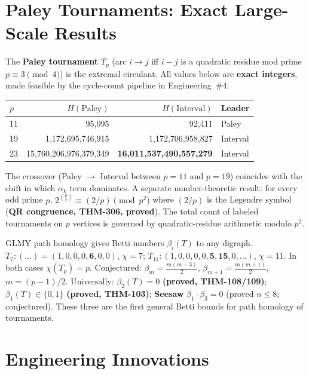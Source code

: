 \documentclass[10pt,letterpaper]{article}
\begin{document}
\section{Paley Tournaments: Exact Large-Scale Results}

The \textbf{Paley tournament} $T_p$ (arc $i\to j$ iff $i-j$ is a quadratic residue mod prime
$p\equiv 3\pmod 4$) is the extremal circulant. All values below are \textbf{exact integers},
made feasible by the cycle-count pipeline in Engineering~\#4:

\vspace{2pt}
\begin{center}
\small
\begin{tabular}{lrrl}
\toprule
$p$ & $H(\text{Paley})$ & $H(\text{Interval})$ & Leader \\
\midrule
11 & 95,095 & 92,411 & Paley \\
19 & 1,172,695,746,915 & 1,172,706,958,827 & Interval \\
23 & 15,760,206,976,379,349 & \textbf{16,011,537,490,557,279} & Interval \\
\bottomrule
\end{tabular}
\end{center}
\vspace{2pt}

The crossover (Paley $\to$ Interval between $p=11$ and $p=19$) coincides with the shift in
which $\alpha_k$ term dominates. A separate number-theoretic result: for every odd prime $p$,
$2^{\binom{p}{2}} \equiv (2/p) \pmod{p^2}$ where $(2/p)$ is the Legendre symbol
(\textbf{QR congruence, THM-306, proved}). The total count of labeled tournaments on $p$
vertices is governed by quadratic-residue arithmetic modulo $p^2$.

GLMY path homology gives Betti numbers $\beta_i(T)$ to any digraph.
$T_7\!: (\ldots) = (1,0,0,0,\mathbf{6},0,0)$, $\chi=7$;\;
$T_{11}\!: (1,0,0,0,0,\mathbf{5},\mathbf{15},0,\ldots)$, $\chi=11$. In both cases $\chi(T_p)=p$.
Conjectured: $\beta_m = \tfrac{m(m-3)}{2}$, $\beta_{m+1} = \tfrac{m(m+1)}{2}$, $m=(p-1)/2$.
Universally: $\beta_2(T)=0$ \textbf{(proved, THM-108/109)}; $\beta_1(T)\in\{0,1\}$
\textbf{(proved, THM-103)}; \textbf{Seesaw} $\beta_1\!\cdot\!\beta_3=0$ (proved $n\leq 8$;
conjectured). These three are the first general Betti bounds for path homology of tournaments.

\section{Engineering Innovations}
\end{document}
